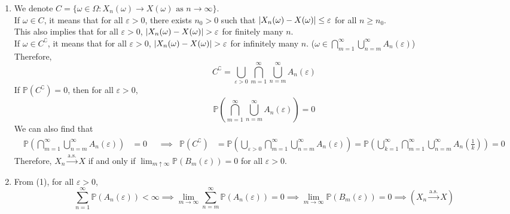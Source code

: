 \documentclass{huhtakm-template-book}
\newcommand{\prob}{\mathbb{P}}
\begin{document}
    \begin{proofing}
        \begin{enumerate}
            \item We denote $C=\{\omega\in\Omega:X_{n}(\omega)\to X(\omega)\text{ as }n\to\infty\}$.\\
            If $\omega\in C$, it means that for all $\varepsilon>0$, there exists $n_{0}>0$ such that $\left|{X_{n}(\omega)-X(\omega)}\right|\leq\varepsilon$ for all $n\geq n_{0}$.\\
            This also implies that for all $\varepsilon>0$, $\abs{X_{n}(\omega)-X(\omega)}>\varepsilon$ for finitely many $n$.\\
            If $\omega\in C^{\complement}$, it means that for all $\varepsilon>0$, $\abs{X_{n}(\omega)-X(\omega)}>\varepsilon$ for infinitely many $n$. ($\omega\in\bigcap_{m=1}^{\infty}\bigcup_{n=m}^{\infty}A_{n}(\varepsilon)$)\\
            Therefore,
            \begin{equation*}
                C^{\complement}=\bigcup_{\varepsilon>0}\bigcap_{m=1}^{\infty}\bigcup_{n=m}^{\infty}A_{n}(\varepsilon)
            \end{equation*}
            If $\prob(C^{\complement})=0$, then for all $\varepsilon>0$,
            \begin{equation*}
                \prob\left(\bigcap_{m=1}^{\infty}\bigcup_{n=m}^{\infty}A_{n}(\varepsilon)\right)=0
            \end{equation*}
            We can also find that
            \begin{align*}
                \prob\left(\bigcap_{m=1}^{\infty}\bigcup_{n=m}^{\infty}A_{n}(\varepsilon)\right)&=0 & &\implies & \prob(C^{\complement})&=\prob\left(\bigcup_{\varepsilon>0}\bigcap_{m=1}^{\infty}\bigcup_{n=m}^{\infty}A_{n}(\varepsilon)\right)=\prob\left(\bigcup_{k=1}^{\infty}\bigcap_{m=1}^{\infty}\bigcup_{n=m}^{\infty}A_{n}\left(\frac{1}{k}\right)\right)=0
            \end{align*}
            Therefore, $X_{n}\xrightarrow{\text{a.s.}}X$ if and only if $\lim_{m\uparrow\infty}\prob(B_{m}(\varepsilon))=0$ for all $\varepsilon>0$.
            \item From (1), for all $\varepsilon>0$,
            \begin{equation*}
                \sum_{n=1}^{\infty}\prob(A_{n}(\varepsilon))<\infty\implies\lim_{m\to\infty}\sum_{n=m}^{\infty}\prob(A_{n}(\varepsilon))=0\implies\lim_{m\to\infty}\prob(B_{m}(\varepsilon))=0\implies(X_{n}\xrightarrow{\text{a.s.}}X)
            \end{equation*}
        \end{enumerate}
    \end{proofing}
\end{document}
